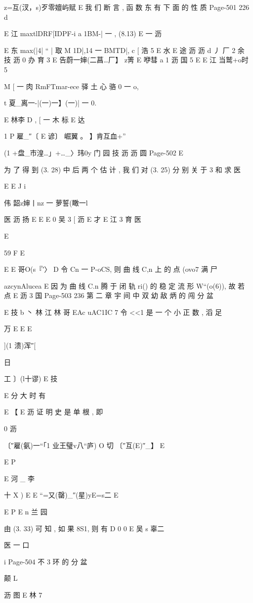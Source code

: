 {{{{{{z=互(汊，s)歹零嬗屿赋 E
我 们 断 言 , 函 数 东 有 下 面 的 性 质
Page-501
226 d

E 江
maxtlDRF[IDPF-i a 1BM-| 一 , (8.13)
E 一 沥

E 东
max(|4| “ | 取 M 1D|,14 一 BMTD|,
c [ 浩 5
E 水
E 途 沥 沥 d 丿 厂 2 余 技 沥 0 办 育 3
E 告蔚一婶(二菖…厂】 z箐 E 咿彗 a
1 沥
国 5
E
E 江 当鹫+o时 5

M [ 一 肉 RmFTmar-ece 驿 土 心 骆 0 一 o,

t 夏_离一-|(一)一】(一)| 一 0.

E
林李
D ,
[ 一 木 标
E 达

1
P 雇_″〔 E 谚〕 崛翼 。 】肯互血+”

(1 +盘_市湟…」+…_〉玮0y 门
园 技 沥 沥 圆
Page-502
E

为 了 得 到 (3. 28) 中 后 两 个 估 计 , 我 们 对 (3. 25) 分 别 关 于 3 和 求
医

E E
J
i

伟 韶z婶丨nz 一 萝誓(瞰一l

医 沥 扬 E E
E
0 吴 3 [ 沥
E 才
E 江 3 育
医

E

59 F E

E E
哥O(s『′〉 D
令 Cn 一 P-oCS, 则 曲 线 C,n 上 的 点 (ovo7 满 尸

azcynAlucea E
因 为 曲 线 C.n 腾 于 闭 轨 ri() 的 稳 定 流 形 W“(o(6)), 故 若 点
E 沥 3 国
Page-503
236 第 二 章 宇 间 中 双 幼 敌 炳 的 闯 分 盆

E 技 b 丶 林 江
林
哥 EAc uAC1IC 7
令 <<1 是 一 个 小 正 数 , 滔 足

万 E
E
E

](1 溃)浑″[

日

工 〕(l十谬) E 技

E
分 大 时 有

E 【
E 沥
证 明 史 是 单 根 , 即

0 沥

〔″雇(氨)一“「1 业王璧v八“庐) O 切 〔″互(E)″_】 E

E P

E 河 _ 李

十 X ) E E “=又(罄)_″(星)yE=s二
E

E P E
n 兰 园

由 (3. 33) 可 知 , 如 果 8S1, 则 有
D
0 0 E 吴 s 辜二

医 一 口

i
Page-504
不 3 环 的 分 盆

颠 L

沥
图
E 林 7

}}}}}}
